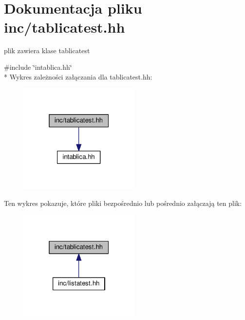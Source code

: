 \section{Dokumentacja pliku inc/tablicatest.hh}
\label{tablicatest_8hh}


plik zawiera klase tablicatest  


{\ttfamily \#include \char`\"{}intablica.\+hh\char`\"{}}\\*
Wykres zależności załączania dla tablicatest.\+hh\+:
\nopagebreak
\begin{figure}[H]
\begin{center}
\leavevmode
\includegraphics[width=171pt]{tablicatest_8hh__incl}
\end{center}
\end{figure}
Ten wykres pokazuje, które pliki bezpośrednio lub pośrednio załączają ten plik\+:
\nopagebreak
\begin{figure}[H]
\begin{center}
\leavevmode
\includegraphics[width=171pt]{tablicatest_8hh__dep__incl}
\end{center}
\end{figure}
